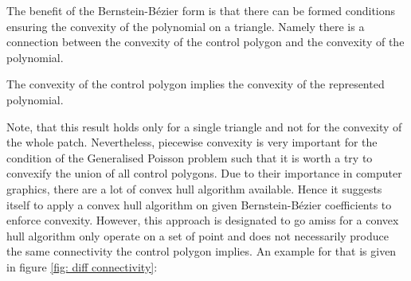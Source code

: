 The benefit of the Bernstein-B\'ezier form is that there can be formed conditions ensuring the convexity of the polynomial on a triangle. Namely there is a connection between the convexity of the control polygon and the convexity of the polynomial.
\begin{theorem}
	The convexity of the control polygon implies the convexity of the represented polynomial.
\end{theorem}
Note, that this result holds only for a single triangle and not for the convexity of the whole patch. Nevertheless, piecewise convexity is very important for the condition of the Generalised Poisson problem such that it is worth a try to convexify the union of all control polygons.
Due to their importance in computer graphics, there are a lot of convex hull algorithm available. Hence it suggests itself to apply a convex hull algorithm on given Bernstein-B\'ezier coefficients to enforce convexity. However, this approach is designated to go amiss for a convex hull algorithm only operate on a set of point and does not necessarily produce the same connectivity the control polygon implies. An example for that is given in figure \ref{fig: diff connectivity}:
